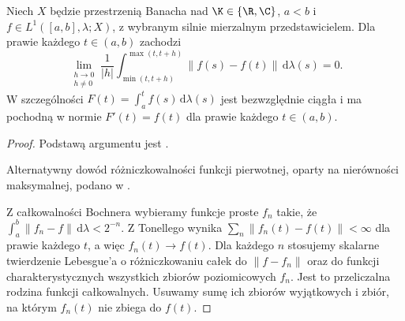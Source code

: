 \begin{twierdzenie}
\label{thm:bochner-lebesgue-differentiation15b}
Niech $X$ będzie przestrzenią Banacha nad $\K\in\{\R,\C\}$,
$a<b$ i $f\in L^1([a,b],\lambda;X)$, z wybranym
silnie mierzalnym przedstawicielem. Dla prawie każdego
$t\in(a,b)$ zachodzi
\[
 \lim_{\substack{h\to0\\h\ne0}}
 \frac1{|h|}\int_{\min(t,t+h)}^{\max(t,t+h)}
 \|f(s)-f(t)\|\,\mathrm d\lambda(s)=0.
\]
W szczególności $F(t)=\int_a^t f(s)\,\mathrm d\lambda(s)$
jest bezwzględnie ciągła i ma pochodną w normie
$F'(t)=f(t)$ dla prawie każdego $t\in(a,b)$.
\end{twierdzenie}
\begin{proof}
Podstawą argumentu jest .

Alternatywny dowód różniczkowalności funkcji pierwotnej, oparty na nierówności maksymalnej, podano w .

Z całkowalności Bochnera wybieramy funkcje proste $f_n$
takie, że $\int_a^b\|f_n-f\|\,\mathrm d\lambda<2^{-n}$.
Z Tonellego wynika $\sum_n\|f_n(t)-f(t)\|<\infty$
dla prawie każdego $t$, a więc $f_n(t)\to f(t)$.
Dla każdego $n$ stosujemy skalarne twierdzenie Lebesgue'a
o różniczkowaniu całek do $\|f-f_n\|$ oraz do funkcji
charakterystycznych wszystkich zbiorów poziomicowych
$f_n$. Jest to przeliczalna rodzina funkcji całkowalnych.
Usuwamy sumę ich zbiorów wyjątkowych i zbiór, na
którym $f_n(t)$ nie zbiega do $f(t)$.


\end{proof}
